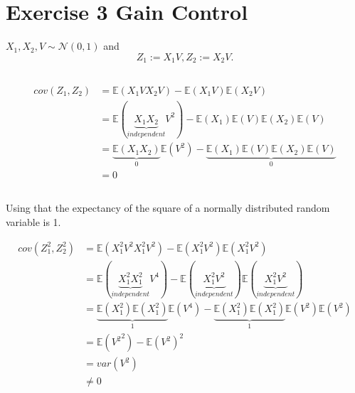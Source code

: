 \documentclass[]{article}
\begin{document}

\section{Exercise 3 Gain Control} %
\label{sg:sec:exercise_3_gain_control}

$X_1, X_2, V \sim \mathcal{N}(0,1)$ and
\begin{equation}
	Z_1 := X_1 V, Z_2 := X_2 V.
\end{equation}

\subsection{} %
\label{sg:ssub:blub}
\begin{equation*}
	\begin{aligned}
		cov(Z_1, Z_2) 
		&= \mathbb{E}(X_1 V X_2 V) - \mathbb{E}(X_1 V) \mathbb{E}(X_2 V) \\
		&= \mathbb{E}(\underbrace{X_1 X_2}_{independent} V^2) - \mathbb{E}(X_1) \mathbb{E}(V) \mathbb{E}(X_2) \mathbb{E}(V) \\
		&= \underbrace{\mathbb{E}(X_1 X_2)}_0 \mathbb{E}(V^2) - \underbrace{\mathbb{E}(X_1) \mathbb{E}(V) \mathbb{E}(X_2) \mathbb{E}(V)}_0 \\
		&= 0
	\end{aligned}
\end{equation*}

\subsection{} %
\label{sg:ssub:bla}

Using that the expectancy of the square of a normally distributed random variable is 1.

\begin{equation*}
	\begin{aligned}
		cov(Z^2_1, Z^2_2) 
		&= \mathbb{E}(X^2_1 V^2 X^2_1 V^2) - \mathbb{E}(X^2_1 V^2) \mathbb{E}(X^2_1 V^2) \\
		&= \mathbb{E}(\underbrace{X^2_1 X^2_1}_{independent} V^4) - 
			\mathbb{E}(\underbrace{X^2_1 V^2}_{independent}) \mathbb{E}(\underbrace{X^2_1 V^2}_{independent}) \\
		&= \underbrace{\mathbb{E}(X^2_1)\mathbb{E}(X^2_1)}_{1} \mathbb{E}(V^4) - 
			\underbrace{\mathbb{E}(X^2_1) \mathbb{E}(X^2_1)}_{1} \mathbb{E}(V^2) \mathbb{E}(V^2) \\
		&= \mathbb{E}({V^{2}}^2) - \mathbb{E}(V^2)^2 \\
		&= var(V^2) \\
		&\neq 0 \\
	\end{aligned}
\end{equation*}



\end{document}
